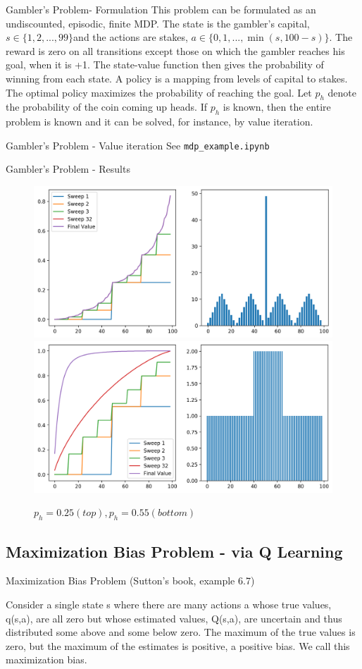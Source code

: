 \documentclass{beamer}
\begin{document}
\begin{frame}{Gambler's Problem- Formulation}
This problem can be formulated as an undiscounted, episodic, finite MDP. The state is the gambler's capital, $s \in \{1,2,...,99\}$and the actions are stakes, $a \in \{0,1,..., \min(s,100-s)\}$. 
The reward is zero on all transitions except those on which the gambler reaches his goal, when it is +1. 
The state-value function then gives the probability of winning from each state. A policy is a mapping from levels of capital to stakes. 
The optimal policy maximizes the probability of reaching the goal. 
Let $p_h$ denote the probability of the coin coming up heads. 
If $p_h$ is known, then the entire problem is known and it can be solved, for instance, by value iteration. 
\end{frame}

\begin{frame}{Gambler's Problem - Value iteration}
    See \texttt{mdp\_example.ipynb}
\end{frame}

\begin{frame}{Gambler's Problem - Results}
\begin{figure}[htpb]
    \centering
    \includegraphics[width=0.6\linewidth]{pic/gambler25.png}
    \includegraphics[width=0.6\linewidth]{pic/gambler55.png}
    \caption{$p_h=0.25 (top), p_h=0.55 (bottom)$}
\end{figure}
\end{frame}


\subsection{Maximization Bias Problem - via Q Learning}
\begin{frame}{Maximization Bias Problem}
(Sutton's book, example 6.7)

Consider a single state s where there are many actions a whose true values, q(s,a), are all zero but whose estimated values, Q(s,a), are uncertain and thus distributed some above and some below zero. The maximum of the true values is zero, but the maximum of the estimates is positive, a positive bias. We call this maximization bias.
\end{frame}
\end{document}
